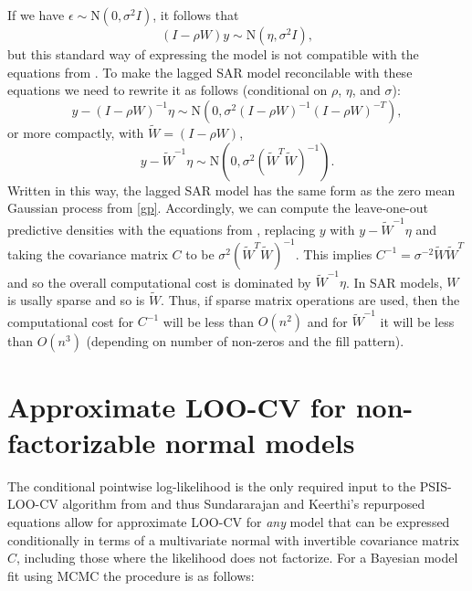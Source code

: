 \documentclass[11pt]{article}
\begin{document}
If we have $\epsilon \sim \mathrm{N}(0, \sigma^2 I)$, it follows that 
%
\begin{equation}
\label{lagsar}
(I - \rho W) y \sim \mathrm{N}(\eta, \sigma^2 I),
\end{equation}
%
but this standard way of expressing the model is not compatible with the equations 
from \cite{sundararajan2001}. To make the lagged SAR model reconcilable with 
these equations we need to rewrite it as follows (conditional on 
$\rho$, $\eta$, and $\sigma$):
%
\begin{equation}
y - (I - \rho W)^{-1} \eta \sim \mathrm{N}\left(0, \sigma^2 (I - \rho W)^{-1} (I - \rho W)^{-T} \right),
\end{equation}
%
or more compactly, with $\widetilde{W} = (I - \rho W)$, 
%
\begin{equation}
y - \widetilde{W}^{-1} \eta \sim \mathrm{N}\left(0, \sigma^2  (\widetilde{W}^T \widetilde{W})^{-1} \right).
\end{equation}
%
Written in this way, the lagged SAR model has the same form as the zero mean Gaussian process from 
\eqref{gp}. Accordingly, we can compute the leave-one-out predictive densities with the equations from 
\cite{sundararajan2001}, replacing $y$ with $y - \widetilde{W}^{-1} \eta$ and taking the covariance
matrix $C$ to be $\sigma^2  (\widetilde{W}^T \widetilde{W})^{-1}$. 
This implies $C^{-1}=\sigma^{-2}\widetilde{W} \widetilde{W}^T$ and so the overall computational cost is 
dominated by $\widetilde{W}^{-1} \eta$. In SAR models, $W$ is usally sparse and so is $\widetilde{W}$. 
Thus, if sparse matrix operations are used, then the computational cost for $C^{-1}$ will be less than 
$O(n^2)$ and for $\widetilde{W}^{-1}$ it will be less than $O(n^3)$ (depending on number of non-zeros and the fill pattern).

\section{Approximate LOO-CV for non-factorizable normal models}
\label{sec-approx}

The conditional pointwise log-likelihood is the only required input to the
PSIS-LOO-CV algorithm from \cite{vehtari2017loo} and thus Sundararajan and
Keerthi's repurposed equations allow for approximate LOO-CV for \emph{any} model
that can be expressed conditionally in terms of a multivariate normal with
invertible covariance matrix $C$, including those where the likelihood does not
factorize. For a Bayesian model fit using MCMC the procedure is as follows:
\end{document}
